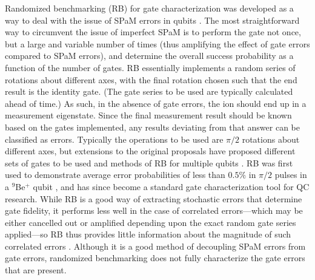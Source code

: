 \documentclass[%
12pt,
 amsmath,amssymb,
]{revtex4-2}
\begin{document}
Randomized benchmarking (RB) for gate characterization was developed as a way to deal with the issue of SPaM errors in qubits \cite{EmersonRB2005,KnillRB2008}. The most straightforward way to circumvent the issue of imperfect SPaM is to perform the gate not once, but a large and variable number of times (thus amplifying the effect of gate errors compared to SPaM errors), and determine the overall success probability as a function of the number of gates. RB essentially implements a random series of rotations about different axes, with the final rotation chosen such that the end result is the identity gate. (The gate series to be used are typically calculated ahead of time.) As such, in the absence of gate errors, the ion should end up in a measurement eigenstate. Since the final measurement result should be known based on the gates implemented, any results deviating from that answer can be classified as errors. Typically the operations to be used are $\pi/2$ rotations about different axes, but extensions to the original proposals have proposed different sets of gates to be used \cite{DankertUnitaryRB2009,Carignan-DugasDihedralRB2015,CrossDihedralRB2016} and methods of RB for multiple qubits \cite{MagesanScalableRB2011, MagesanCharacterize2012}. RB was first used to demonstrate average error probabilities of less than $0.5 \%$ in $\pi/2$ pulses in a $^9$Be$^+$ qubit \cite{KnillRB2008}, and has since become a standard gate characterization tool for QC research. While RB is a good way of extracting stochastic errors that determine gate fidelity, it performs less well in the case of correlated errors---which may be either cancelled out or amplified depending upon the exact random gate series applied---so RB thus provides little information about the magnitude of such correlated errors \cite{BallCorrNoiseRB2016,MavadiaExperimental2018}. Although it is a good method of decoupling SPaM errors from gate errors, randomized benchmarking does not fully characterize the gate errors that are present.
\end{document}
